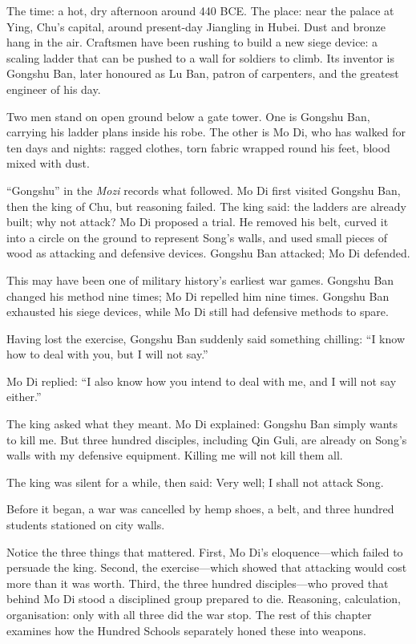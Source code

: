 The time: a hot, dry afternoon around 440 BCE. The place: near the palace at Ying, Chu's capital, around present-day Jiangling in Hubei. Dust and bronze hang in the air. Craftsmen have been rushing to build a new siege device: a scaling ladder that can be pushed to a wall for soldiers to climb. Its inventor is Gongshu Ban, later honoured as Lu Ban, patron of carpenters, and the greatest engineer of his day.

Two men stand on open ground below a gate tower. One is Gongshu Ban, carrying his ladder plans inside his robe. The other is Mo Di, who has walked for ten days and nights: ragged clothes, torn fabric wrapped round his feet, blood mixed with dust.

``Gongshu'' in the \textit{Mozi} records what followed. Mo Di first visited Gongshu Ban, then the king of Chu, but reasoning failed. The king said: the ladders are already built; why not attack? Mo Di proposed a trial. He removed his belt, curved it into a circle on the ground to represent Song's walls, and used small pieces of wood as attacking and defensive devices. Gongshu Ban attacked; Mo Di defended.

This may have been one of military history's earliest war games. Gongshu Ban changed his method nine times; Mo Di repelled him nine times. Gongshu Ban exhausted his siege devices, while Mo Di still had defensive methods to spare.

Having lost the exercise, Gongshu Ban suddenly said something chilling: ``I know how to deal with you, but I will not say.''

Mo Di replied: ``I also know how you intend to deal with me, and I will not say either.''

The king asked what they meant. Mo Di explained: Gongshu Ban simply wants to kill me. But three hundred disciples, including Qin Guli, are already on Song's walls with my defensive equipment. Killing me will not kill them all.

The king was silent for a while, then said: Very well; I shall not attack Song.

Before it began, a war was cancelled by hemp shoes, a belt, and three hundred students stationed on city walls.

Notice the three things that mattered. First, Mo Di's eloquence---which failed to persuade the king. Second, the exercise---which showed that attacking would cost more than it was worth. Third, the three hundred disciples---who proved that behind Mo Di stood a disciplined group prepared to die. Reasoning, calculation, organisation: only with all three did the war stop. The rest of this chapter examines how the Hundred Schools separately honed these into weapons.

